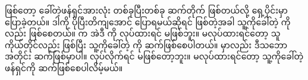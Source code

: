   ဖြစ်တော့ ခေါ်တဲ့ဖန်ရှင်အားလုံး တစ်ခုပြီးတစ်ခု ဆက်တိုက်  ဖြစ်တယ်လို့ ရှေ့ပိုင်းမှာ ပြောခဲ့တယ်။ ဒါကို ပိုပြီးတိကျအောင် ပြောရမယ်ဆိုရင်    ဖြစ်တဲ့အခါ သူ့ကိုခေါ်တဲ့  ကိုလည်း  ဖြစ်စေတယ်။  က အဲဒီ  ကို  လုပ်ထားရင်  မဖြစ်ဘူး။ မလုပ်ထားရင်တော့ သူကိုယ်တိုင်လည်း  ဖြစ်ပြီး သူ့ကိုခေါ်တဲ့  ကို  ဆက်ဖြစ်စေပါတယ်။  မှာလည်း ဒီသဘောအတိုင်း ဆက်ဖြစ်မှာပါ။   လုပ်လိုက်ရင်  မဖြစ်တော့ဘူး။ မလုပ်ထားရင်တော့ သူ့ကိုခေါ်တဲ့  ဖန်ရှင်ကို  ဆက်ဖြစ်စေပါလိမ့်မယ်။ 


